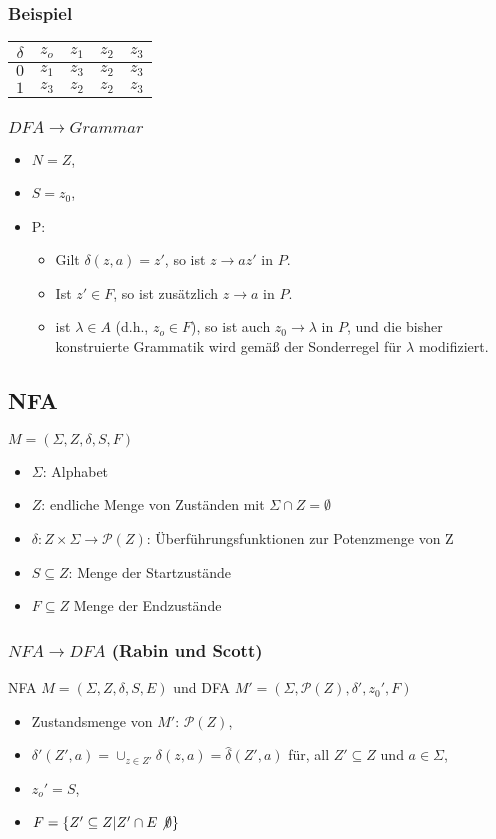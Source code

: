 \documentclass[9pt]{article}
\begin{document}
\subsubsection{Beispiel}
	\begin{tabular}{|c||c|c|c|c|}
		\hline
		$\delta$ & $z_o$ & $z_1$ & $z_2$ & $z_3$\\
		\hline \hline
		$0$ & $z_1$ & $z_3$ & $z_2$ & $z_3$\\
		\hline
		$1$ & $z_3$ & $z_2$ & $z_2$ & $z_3$\\
		\hline
	\end{tabular}
\subsubsection{$DFA \rightarrow Grammar$}
	\begin{itemize}
		\item $N = Z$,
		\item $S = z_0$,
		\item P:
		\begin{itemize}
			\item Gilt $\delta(z, a) = z'$, so ist $z \rightarrow az'$ in $P$.
			\item Ist $z' \in F$, so ist zusätzlich $z \rightarrow a$ in $P$.
			\item ist $\lambda \in A$ (d.h., $z_o \in F$), so ist auch $z_0 \rightarrow \lambda$ in $P$, und die bisher konstruierte Grammatik wird gemäß der Sonderregel für $\lambda$ modifiziert.
		\end{itemize}
	\end{itemize}
\subsection{NFA}
$M=(\Sigma, Z, \delta, S, F)$
\begin{itemize}
	\item $\Sigma$: Alphabet
	\item $Z$: endliche Menge von Zuständen mit $\Sigma \cap Z = \emptyset$
	\item $\delta: Z \times \Sigma \rightarrow \mathcal{P}(Z)$: Überführungsfunktionen zur Potenzmenge von Z
	\item $S \subseteq Z$: Menge der Startzustände
	\item $F \subseteq Z$ Menge der Endzustände
\end{itemize}
\subsubsection{$NFA \rightarrow DFA$ (Rabin und Scott)}
NFA $M = (\Sigma, Z, \delta, S, E)$ und DFA $M' = (\Sigma, \mathcal{P}(Z), \delta', z_0', F)$
\begin{itemize}
	\item Zustandsmenge von $M'$: $\mathcal{P}(Z)$,
	\item $\delta'(Z', a)= \cup_{z\in Z'}\delta(z, a)=\hat\delta(Z', a)$ für, all $Z' \subseteq Z$ und $a \in \Sigma$,
	\item $z_o' = S$,
	\item $F = \{Z' \subseteq Z | Z' \cap E \not \emptyset\}$
\end{itemize}
\end{document}
